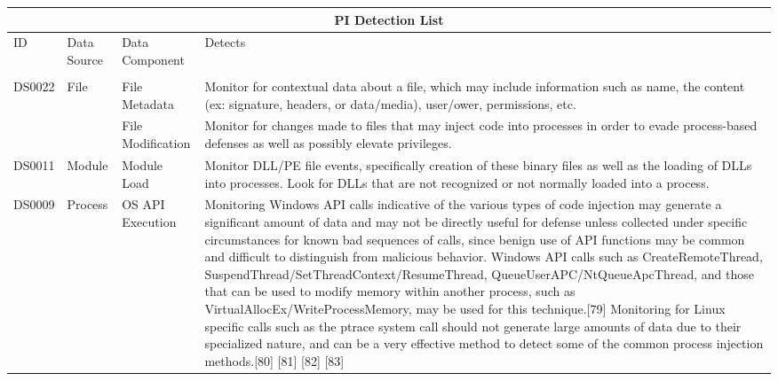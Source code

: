 \documentclass{article}
\begin{document}
\begin{table}[h!]
\centering
\begin{tabular}{ |p{1.2cm}||p{2cm}|p{3cm}|p{8cm}|  }
  \hline
  \multicolumn{4}{|c|}{PI Detection List} \\
  \hline
  ID	& Data Source & Data Component & Detects \\
  \hline
   & & & \\
  DS0022 & File & File Metadata & Monitor for contextual data about a file, which may include information such as name,
                                  the content (ex: signature, headers, or data/media), user/ower, permissions, etc. \\
        & & File Modification & Monitor for changes made to files that may inject code into processes in order to evade
                                process-based defenses as well as possibly elevate privileges. \\
  \hline
  DS0011 & Module & Module Load & Monitor DLL/PE file events, specifically creation of these binary files as well as
                                  the loading of DLLs into processes. Look for DLLs that are not recognized or not
                                  normally loaded into a process. \\
  \hline
  DS0009 & Process & OS API Execution & Monitoring Windows API calls indicative of the various types of code injection
                                        may generate a significant amount of data and may not be directly useful for
                                        defense unless collected under specific circumstances for known bad sequences
                                        of calls, since benign use of API functions may be common and difficult to
                                        distinguish from malicious behavior. Windows API calls such as CreateRemoteThread,
                                        SuspendThread/SetThreadContext/ResumeThread, QueueUserAPC/NtQueueApcThread, and
                                        those that can be used to modify memory within another process, such as
                                        VirtualAllocEx/WriteProcessMemory, may be used for this technique.[79] Monitoring
                                        for Linux specific calls such as the ptrace system call should not generate large
                                        amounts of data due to their specialized nature, and can be a very effective
                                        method to detect some of the common process injection methods.[80] [81] [82] [83] \\

\end{tabular}
\end{table}
\end{document}
